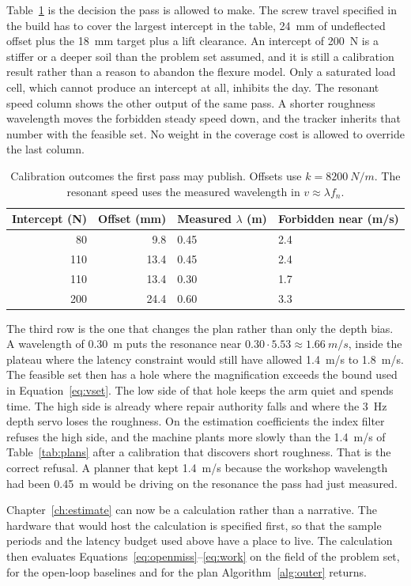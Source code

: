 Table~\ref{tab:cal} is the decision the pass is allowed to make. The screw travel specified in the build has to cover the largest intercept in the table, \SI{24}{mm} of undeflected offset plus the \SI{18}{mm} target plus a lift clearance. An intercept of \SI{200}{N} is a stiffer or a deeper soil than the problem set assumed, and it is still a calibration result rather than a reason to abandon the flexure model. Only a saturated load cell, which cannot produce an intercept at all, inhibits the day. The resonant speed column shows the other output of the same pass. A shorter roughness wavelength moves the forbidden steady speed down, and the tracker inherits that number with the feasible set. No weight in the coverage cost is allowed to override the last column.

\begin{table}[ht]
\centering
\caption{Calibration outcomes the first pass may publish. Offsets use \(k=\SI{8200}{N/m}\). The resonant speed uses the measured wavelength in \(v \approx \lambda f_n\).}
\label{tab:cal}
\begin{tabular}{@{}rrll@{}}
\toprule
Intercept (N) & Offset (mm) & Measured \(\lambda\) (m) & Forbidden near (m/s) \\
\midrule
80 & 9.8 & 0.45 & 2.4 \\
110 & 13.4 & 0.45 & 2.4 \\
110 & 13.4 & 0.30 & 1.7 \\
200 & 24.4 & 0.60 & 3.3 \\
\bottomrule
\end{tabular}
\end{table}

The third row is the one that changes the plan rather than only the depth bias. A wavelength of \SI{0.30}{m} puts the resonance near \(0.30\cdot 5.53\approx\SI{1.66}{m/s}\), inside the plateau where the latency constraint would still have allowed \SI{1.4}{m/s} to \SI{1.8}{m/s}. The feasible set then has a hole where the magnification exceeds the bound used in Equation~\eqref{eq:vset}. The low side of that hole keeps the arm quiet and spends time. The high side is already where repair authority falls and where the \SI{3}{Hz} depth servo loses the roughness. On the estimation coefficients the index filter refuses the high side, and the machine plants more slowly than the \SI{1.4}{m/s} of Table~\ref{tab:plans} after a calibration that discovers short roughness. That is the correct refusal. A planner that kept \SI{1.4}{m/s} because the workshop wavelength had been \SI{0.45}{m} would be driving on the resonance the pass had just measured.

Chapter~\ref{ch:estimate} can now be a calculation rather than a narrative. The hardware that would host the calculation is specified first, so that the sample periods and the latency budget used above have a place to live. The calculation then evaluates Equations~\eqref{eq:openmiss}--\eqref{eq:work} on the field of the problem set, for the open-loop baselines and for the plan Algorithm~\ref{alg:outer} returns.
